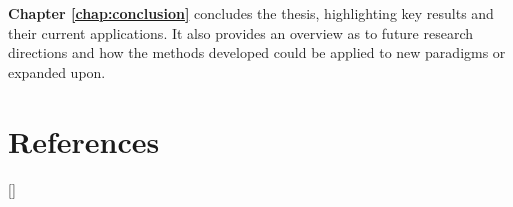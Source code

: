 \textbf{Chapter \ref{chap:conclusion}} concludes the thesis, highlighting key results and their current applications. It also provides an overview as to future research directions and how the methods developed could be applied to new paradigms or expanded upon.\\

\newpage
\section*{References}
[\refname]{}
\printbibliography